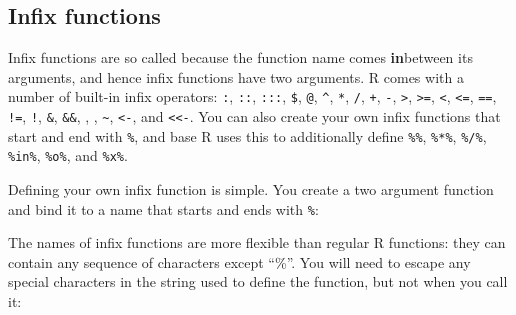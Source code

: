 \documentclass[]{book}
\newenvironment{Shaded}{\begin{snugshade}}{\end{snugshade}}
\newcommand{\CharTok}[1]{\textcolor[rgb]{0.31,0.60,0.02}{#1}}
\newcommand{\ControlFlowTok}[1]{\textcolor[rgb]{0.13,0.29,0.53}{\textbf{#1}}}
\newcommand{\DataTypeTok}[1]{\textcolor[rgb]{0.13,0.29,0.53}{#1}}
\newcommand{\KeywordTok}[1]{\textcolor[rgb]{0.13,0.29,0.53}{\textbf{#1}}}
\newcommand{\NormalTok}[1]{#1}
\newcommand{\OperatorTok}[1]{\textcolor[rgb]{0.81,0.36,0.00}{\textbf{#1}}}
\newcommand{\StringTok}[1]{\textcolor[rgb]{0.31,0.60,0.02}{#1}}
\theoremstyle{definition}
\theoremstyle{definition}
\theoremstyle{definition}
\theoremstyle{remark}
\begin{document}
\hypertarget{infix-functions}{%
\subsection{Infix functions}\label{infix-functions}}

Infix functions are so called because the function name comes
\textbf{in}between its arguments, and hence infix functions have two
arguments. R comes with a number of built-in infix operators:
\texttt{:}, \texttt{::}, \texttt{:::}, \texttt{\$}, \texttt{@},
\texttt{\^{}}, \texttt{*}, \texttt{/}, \texttt{+}, \texttt{-},
\texttt{\textgreater{}}, \texttt{\textgreater{}=}, \texttt{\textless{}},
\texttt{\textless{}=}, \texttt{==}, \texttt{!=}, \texttt{!},
\texttt{\&}, \texttt{\&\&}, \texttt{\textbar{}},
\texttt{\textbar{}\textbar{}}, \texttt{\textasciitilde{}},
\texttt{\textless{}-}, and \texttt{\textless{}\textless{}-}. You can
also create your own infix functions that start and end with
\texttt{\%}, and base R uses this to additionally define \texttt{\%\%},
\texttt{\%*\%}, \texttt{\%/\%}, \texttt{\%in\%}, \texttt{\%o\%}, and
\texttt{\%x\%}.

Defining your own infix function is simple. You create a two argument
function and bind it to a name that starts and ends with \texttt{\%}:

\begin{Shaded}
\end{Shaded}

The names of infix functions are more flexible than regular R functions:
they can contain any sequence of characters except ``\%''. You will need
to escape any special characters in the string used to define the
function, but not when you call it:

\begin{Shaded}
\end{Shaded}
\end{document}
